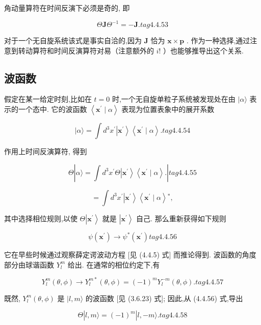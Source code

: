 角动量算符在时间反演下必须是奇的, 即

$$
\Theta \mathbf{J}{\Theta }^{-1} = - \mathbf{J}. tag{4. 4.53}
$$

对于一个无自旋系统该式是事实自洽的,因为 $\mathbf{J}$ 恰为 $\mathbf{x} \times \mathbf{p}$ . 作为一种选择,通过注意到转动算符和时间反演算符对易（注意额外的 $i!$ ）也能够推导出这个关系.

\subsection{波函数}

假定在某一给定时刻,比如在 $t = 0$ 时,一个无自旋单粒子系统被发现处在由 $|\alpha \rangle$ 表示的一个态中. 它的波函数 $\left\langle {{\mathbf{x}}^{\prime } \mid \alpha }\right\rangle$ 表现为位置表象中的展开系数

$$
|\alpha \rangle = \int {d}^{3}{x}^{\prime }\left| {\mathbf{x}}^{\prime }\right\rangle \left\langle {{\mathbf{x}}^{\prime } \mid \alpha }\right\rangle . tag{4. 4.54}
$$

作用上时间反演算符, 得到

$$
\Theta \left| {\alpha \rangle = \int {d}^{3}{x}^{\prime }\Theta \left| {\mathbf{x}}^{\prime }\right\rangle \left\langle {{\mathbf{x}}^{\prime } \mid \alpha }\right\rangle .}\right| tag{4. 4.55}
$$

$$
= \int {d}^{3}{x}^{\prime }\left| {\mathbf{x}}^{\prime }\right\rangle \left\langle {{\mathbf{x}}^{\prime } \mid \alpha }\right\rangle {}^{ * },
$$

其中选择相位规则,以使 $\Theta \left| {\mathbf{x}}^{\prime }\right\rangle$ 就是 $\left| {\mathbf{x}}^{\prime }\right\rangle$ 自己. 那么重新获得如下规则

$$
\psi \left( {\mathbf{x}}^{\prime }\right) \rightarrow {\psi }^{ * }\left( {\mathbf{x}}^{\prime }\right) tag{4. 4.56}
$$

它在早些时候通过观察薛定谔波动方程 [见 (4.4.5) 式] 而推论得到. 波函数的角度部分由球谐函数 ${Y}_{l}^{m}$ 给出. 在通常的相位约定下,有

$$
{Y}_{l}^{m}\left( {\theta ,\phi }\right) \rightarrow {Y}_{l}^{m * }\left( {\theta ,\phi }\right) = {\left( -1\right) }^{m}{Y}_{l}^{-m}\left( {\theta ,\phi }\right) . tag{4. 4.57}
$$

既然, ${Y}_{l}^{m}\left( {\theta ,\phi }\right)$ 是 $|l, m\rangle$ 的波函数 [见 (3.6.23) 式]; 因此,从 (4.4.56) 式,导出

$$
\Theta \left| {l, m\rangle = {\left( -1\right) }^{m}}\right| l, - m\rangle . tag{4. 4.58}
$$

